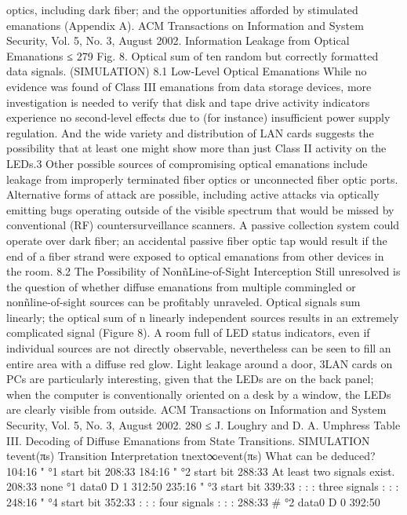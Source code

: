 optics, including dark fiber; and the opportunities afforded by stimulated emanations 
(Appendix A). 
ACM Transactions on Information and System Security, Vol. 5, No. 3, August 2002.
Information Leakage from Optical Emanations ≤ 279 
Fig. 8. Optical sum of ten random but correctly formatted data signals. (SIMULATION) 
8.1 Low-Level Optical Emanations 
While no evidence was found of Class III emanations from data storage devices, 
more investigation is needed to verify that disk and tape drive activity indicators 
experience no second-level effects due to (for instance) insufficient power 
supply regulation. And the wide variety and distribution of LAN cards suggests 
the possibility that at least one might show more than just Class II activity on 
the LEDs.3 
Other possible sources of compromising optical emanations include leakage 
from improperly terminated fiber optics or unconnected fiber optic ports. Alternative 
forms of attack are possible, including active attacks via optically 
emitting bugs operating outside of the visible spectrum that would be missed 
by conventional (RF) countersurveillance scanners. A passive collection system 
could operate over dark fiber; an accidental passive fiber optic tap would result 
if the end of a fiber strand were exposed to optical emanations from other 
devices in the room. 
8.2 The Possibility of NonñLine-of-Sight Interception 
Still unresolved is the question of whether diffuse emanations from multiple 
commingled or nonñline-of-sight sources can be profitably unraveled. Optical 
signals sum linearly; the optical sum of n linearly independent sources results 
in an extremely complicated signal (Figure 8). A room full of LED status indicators, 
even if individual sources are not directly observable, nevertheless can be 
seen to fill an entire area with a diffuse red glow. Light leakage around a door, 
3LAN cards on PCs are particularly interesting, given that the LEDs are on the back panel; when 
the computer is conventionally oriented on a desk by a window, the LEDs are clearly visible from 
outside. 
ACM Transactions on Information and System Security, Vol. 5, No. 3, August 2002.
280 ≤ J. Loughry and D. A. Umphress 
Table III. Decoding of Diffuse Emanations from State Transitions. SIMULATION 
tevent(πs) Transition Interpretation tnext∞event(πs) What can be deduced? 
104:16 " °1 start bit 208:33 
184:16 " °2 start bit 288:33 At least two signals exist. 
208:33 none °1 data0 D 1 312:50 
235:16 " °3 start bit 339:33 : : : three signals : : : 
248:16 " °4 start bit 352:33 : : : four signals : : : 
288:33 # °2 data0 D 0 392:50 
